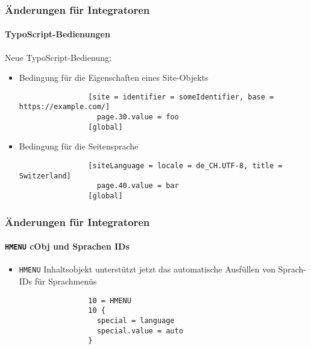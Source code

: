 \begin{frame}[fragile]
	\frametitle{Änderungen für Integratoren}
	\framesubtitle{TypoScript-Bedienungen}

	Neue TypoScript-Bedienung:

	\begin{itemize}
		\item Bedingung für die Eigenschaften eines Site-Objekts

			\begin{lstlisting}
				[site = identifier = someIdentifier, base = https://example.com/]
				  page.30.value = foo
				[global]
			\end{lstlisting}

		\item Bedingung für die Seitensprache

			\begin{lstlisting}
				[siteLanguage = locale = de_CH.UTF-8, title = Switzerland]
				  page.40.value = bar
				[global]
			\end{lstlisting}

	\end{itemize}

\end{frame}


\begin{frame}[fragile]
	\frametitle{Änderungen für Integratoren}
	\framesubtitle{\texttt{HMENU} cObj und Sprachen IDs}


	\begin{itemize}
		\item \texttt{HMENU} Inhaltsobjekt unterstützt jetzt das automatische Ausfüllen von
			Sprach-IDs für Sprachmenüs

			\begin{lstlisting}
				10 = HMENU
				10 {
				  special = language
				  special.value = auto
				}
  			\end{lstlisting}

	\end{itemize}

\end{frame}

